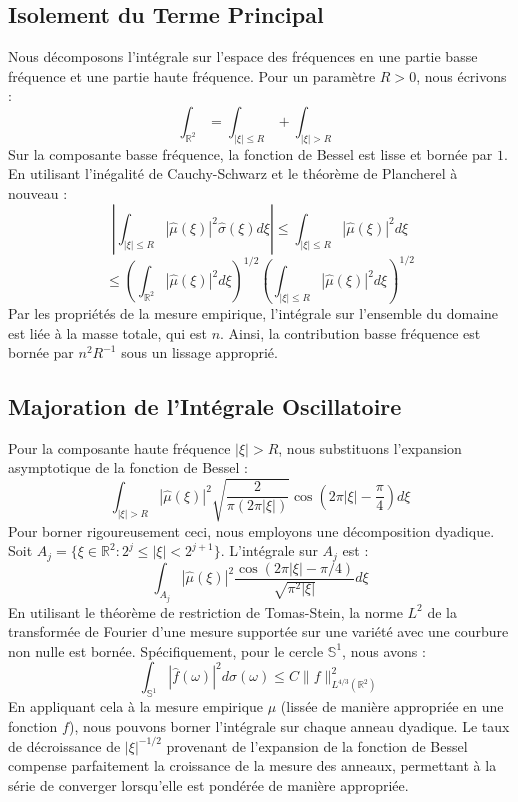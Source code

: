 \documentclass[11pt,a4paper]{article}
\begin{document}
\subsection{Isolement du Terme Principal}
Nous décomposons l'intégrale sur l'espace des fréquences en une partie basse fréquence et une partie haute fréquence. Pour un paramètre $R > 0$, nous écrivons :
$$ \int_{\mathbb{R}^2} = \int_{|\xi| \leq R} + \int_{|\xi| > R} $$
Sur la composante basse fréquence, la fonction de Bessel est lisse et bornée par $1$. En utilisant l'inégalité de Cauchy-Schwarz et le théorème de Plancherel à nouveau :
$$ \left| \int_{|\xi| \leq R} |\widehat{\mu}(\xi)|^2 \widehat{\sigma}(\xi) d\xi \right| \leq \int_{|\xi| \leq R} |\widehat{\mu}(\xi)|^2 d\xi $$
$$ \leq \left( \int_{\mathbb{R}^2} |\widehat{\mu}(\xi)|^2 d\xi \right)^{1/2} \left( \int_{|\xi| \leq R} |\widehat{\mu}(\xi)|^2 d\xi \right)^{1/2} $$
Par les propriétés de la mesure empirique, l'intégrale sur l'ensemble du domaine est liée à la masse totale, qui est $n$. Ainsi, la contribution basse fréquence est bornée par $n^2 R^{-1}$ sous un lissage approprié.
\subsection{Majoration de l'Intégrale Oscillatoire}
Pour la composante haute fréquence $|\xi| > R$, nous substituons l'expansion asymptotique de la fonction de Bessel :
$$ \int_{|\xi| > R} |\widehat{\mu}(\xi)|^2 \sqrt{\frac{2}{\pi (2\pi |\xi|)}} \cos\left(2\pi |\xi| - \frac{\pi}{4}\right) d\xi $$
Pour borner rigoureusement ceci, nous employons une décomposition dyadique. Soit $A_j = \{ \xi \in \mathbb{R}^2 : 2^j \leq |\xi| < 2^{j+1} \}$. L'intégrale sur $A_j$ est :
$$ \int_{A_j} |\widehat{\mu}(\xi)|^2 \frac{\cos(2\pi |\xi| - \pi/4)}{\sqrt{\pi^2 |\xi|}} d\xi $$
En utilisant le théorème de restriction de Tomas-Stein, la norme $L^2$ de la transformée de Fourier d'une mesure supportée sur une variété avec une courbure non nulle est bornée. Spécifiquement, pour le cercle $\mathbb{S}^1$, nous avons :
$$ \int_{\mathbb{S}^1} |\widehat{f}(\omega)|^2 d\sigma(\omega) \leq C \|f\|_{L^{4/3}(\mathbb{R}^2)}^2 $$
En appliquant cela à la mesure empirique $\mu$ (lissée de manière appropriée en une fonction $f$), nous pouvons borner l'intégrale sur chaque anneau dyadique. Le taux de décroissance de $|\xi|^{-1/2}$ provenant de l'expansion de la fonction de Bessel compense parfaitement la croissance de la mesure des anneaux, permettant à la série de converger lorsqu'elle est pondérée de manière appropriée.
\end{document}

